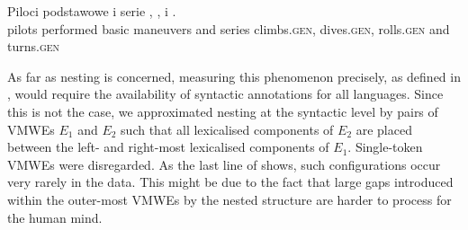 \documentclass[output=paper,
modfonts,
]{langscibook}
\begin{document}
\ea \label{pl:wykonywac-manewry}
\settowidth {} 
\gll Piloci  podstawowe  i serie , ,  i . \\
pilots performed basic maneuvers and series climbs.\textsc{gen}, dives.\textsc{gen}, rolls.\textsc{gen} and turns.\textsc{gen}\\ 
\glt {}
\z

As far as nesting is concerned, measuring this phenomenon precisely, as defined in , would require the availability of syntactic annotations for all languages. Since this is not the case, we approximated nesting at the syntactic level by pairs of VMWEs $E_1$ and $E_2$ such that all lexicalised components of $E_2$ are placed between the left- and right-most lexicalised components of $E_1$. Single-token VMWEs were disregarded.
As the last line of  shows, such configurations occur very rarely in the data. 
This might be due to the fact that large gaps introduced within the outer-most VMWEs by the nested structure are harder to process for the human mind.
\end{document}
